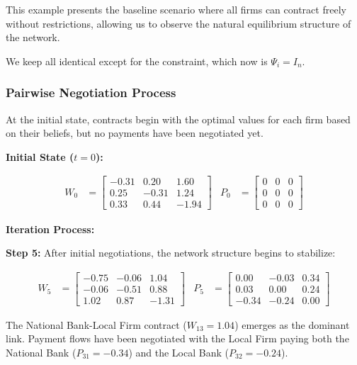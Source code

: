 This example presents the baseline scenario where all firms can contract freely without restrictions, allowing us to observe the natural equilibrium structure of the network.

We keep all identical except for the constraint, which now is $\Psi_i=I_n$.

\subsubsection{Pairwise Negotiation Process \label{ex:convergence_nc}}

At the initial state, contracts begin with the optimal values for each firm based on their beliefs, but no payments have been negotiated yet.

\textbf{Initial State ($t = 0$):}

\begin{align}
    W_0 &= \begin{bmatrix} 
        -0.31 & 0.20 & 1.60 \\ 
        0.25 & -0.31 & 1.24 \\ 
        0.33 & 0.44 & -1.94 
    \end{bmatrix} &
    P_0 &= \begin{bmatrix} 
        0 & 0 & 0 \\ 
        0 & 0 & 0 \\ 
        0 & 0 & 0 
    \end{bmatrix}
\end{align}

\textbf{Iteration Process:}

\textbf{Step 5:} After initial negotiations, the network structure begins to stabilize:

\begin{align}
    W_5 &= \begin{bmatrix} 
        -0.75 & -0.06 & 1.04 \\ 
        -0.06 & -0.51 & 0.88 \\ 
        1.02 & 0.87 & -1.31 
    \end{bmatrix} &
    P_5 &= \begin{bmatrix} 
        0.00 & -0.03 & 0.34 \\ 
        0.03 & 0.00 & 0.24 \\ 
        -0.34 & -0.24 & 0.00 
    \end{bmatrix}
\end{align}

The National Bank-Local Firm contract ($W_{13} = 1.04$) emerges as the dominant link. Payment flows have been negotiated with the Local Firm paying both the National Bank ($P_{31} = -0.34$) and the Local Bank ($P_{32} = -0.24$).

